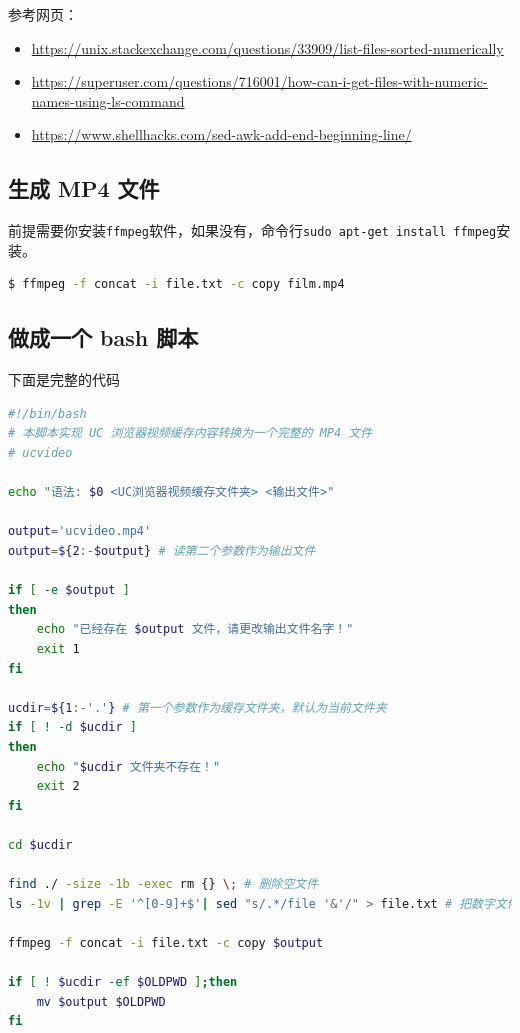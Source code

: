\documentclass[doctor,openright,twoside]{sjtuthesis}
\providecommand{\tightlist}{%
    \setlength{\itemsep}{0pt}\setlength{\parskip}{0pt}}
\newcommand{\passthrough}[1]{#1}
\theoremstyle{plain}
\theoremstyle{definition}
\theoremstyle{remark}
\theoremstyle{ocrenumbox}
\theoremstyle{plain}
\begin{document}
参考网页：

\begin{itemize}
\tightlist
\item
  \url{https://unix.stackexchange.com/questions/33909/list-files-sorted-numerically}
\item
  \url{https://superuser.com/questions/716001/how-can-i-get-files-with-numeric-names-using-ls-command}
\item
  \url{https://www.shellhacks.com/sed-awk-add-end-beginning-line/}
\end{itemize}

\hypertarget{-mp4-}{%
\subsection{生成 MP4 文件}\label{-mp4-}}

前提需要你安装\passthrough{\lstinline!ffmpeg!}软件，如果没有，命令行\passthrough{\lstinline!sudo apt-get install ffmpeg!}安装。

\begin{lstlisting}[language=bash]
$ ffmpeg -f concat -i file.txt -c copy film.mp4
\end{lstlisting}

\hypertarget{-bash-}{%
\subsection{做成一个 bash 脚本}\label{-bash-}}

下面是完整的代码

\begin{lstlisting}[language=bash]
#!/bin/bash
# 本脚本实现 UC 浏览器视频缓存内容转换为一个完整的 MP4 文件
# ucvideo

echo "语法: $0 <UC浏览器视频缓存文件夹> <输出文件>"

output='ucvideo.mp4'
output=${2:-$output} # 读第二个参数作为输出文件

if [ -e $output ]
then
    echo "已经存在 $output 文件，请更改输出文件名字！"
    exit 1
fi

ucdir=${1:-'.'} # 第一个参数作为缓存文件夹，默认为当前文件夹
if [ ! -d $ucdir ]
then
    echo "$ucdir 文件夹不存在！"
    exit 2
fi

cd $ucdir

find ./ -size -1b -exec rm {} \; # 删除空文件
ls -1v | grep -E '^[0-9]+$'| sed "s/.*/file '&'/" > file.txt # 把数字文件按序，并加上行首行尾，写入file.txt

ffmpeg -f concat -i file.txt -c copy $output

if [ ! $ucdir -ef $OLDPWD ];then
    mv $output $OLDPWD
fi
\end{lstlisting}
\end{document}
